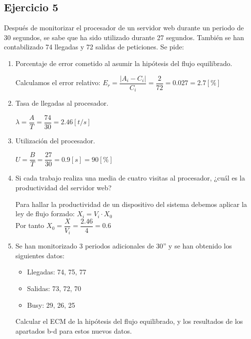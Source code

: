 \subsection{Ejercicio 5}
Después de monitorizar el procesador de un servidor web durante un periodo de 30 segundos, se sabe que ha sido utilizado durante 27 segundos. También se han contabilizado 74 llegadas y 72 salidas de peticiones. Se pide:
\begin{enumerate}
    \item Porcentaje de error cometido al asumir la hipótesis del flujo equilibrado.
    \begin{tcolorbox}[colback=white,colframe=cyan!50!black,fonttitle=\bfseries]
    Calculamos el error relativo: $E_r=\dfrac{|A_i - C_i|}{C_i}=\dfrac{2}{72}=0.027=2.7[\%]$\\
    \end{tcolorbox}
    \item Tasa de llegadas al procesador.
    \begin{tcolorbox}[colback=white,colframe=cyan!50!black,fonttitle=\bfseries]
    $\lambda = \dfrac{A}{T} = \dfrac{74}{30} = 2.46 [t/s]$
    \end{tcolorbox}
    \item Utilización del procesador.
    \begin{tcolorbox}[colback=white,colframe=cyan!50!black,fonttitle=\bfseries]
    $U = \dfrac{B}{T} = \dfrac{27}{30} = 0.9[s] = 90[\%]$
    \end{tcolorbox}
    \item Si cada trabajo realiza una media de cuatro visitas al procesador, ¿cuál es la productividad del servidor web?
    \begin{tcolorbox}[colback=white,colframe=cyan!50!black,fonttitle=\bfseries]
    Para hallar la productividad de un dispositivo del sistema debemos aplicar la ley de flujo forzado:
    $X_i = V_i \cdot X_0$\\ Por tanto $X_0 = \dfrac{X}{V_i} = \dfrac{2.46}{4} = 0.6$
    \end{tcolorbox}
    \item Se han monitorizado 3 periodos adicionales de 30” y se han obtenido los siguientes datos:
    \begin{itemize}
        \item Llegadas: 74, 75, 77
        \item Salidas: 73, 72, 70
        \item Busy: 29, 26, 25
    \end{itemize}
    Calcular el ECM de la hipótesis del flujo equilibrado, y los resultados de los apartados b-d para estos nuevos datos.

\end{enumerate}

